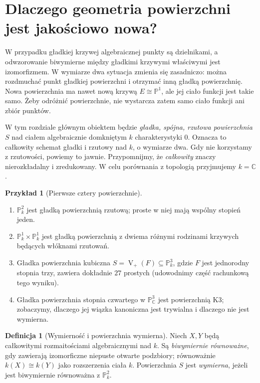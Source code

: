 \documentclass[11pt,a4paper,openany]{report}
\numberwithin{equation}{section}
\theoremstyle{plain}
\theoremstyle{definition}
\newtheorem{definicja}[twierdzenie]{Definicja}
\newtheorem{przyklad}[twierdzenie]{Przykład}
\theoremstyle{remark}
\newcommand{\C}{\mathbb C}
\newcommand{\PP}{\mathbb P}
\newcommand{\V}{\operatorname V}
\begin{document}
\providecommand{\atlasref}[2]{#2}


\section{Dlaczego geometria powierzchni jest jakościowo nowa?}
\label{sec:ga6-motywacja}

W przypadku gładkiej krzywej algebraicznej punkty są dzielnikami,
a odwzorowanie biwymierne między gładkimi krzywymi właściwymi jest
izomorfizmem. W wymiarze dwa sytuacja zmienia się zasadniczo:
można rozdmuchać punkt gładkiej powierzchni i otrzymać inną gładką
powierzchnię. Nowa powierzchnia ma nawet nową krzywą $E\cong\PP^1$,
ale jej ciało funkcji jest takie samo. Żeby odróżnić powierzchnie,
nie wystarcza zatem samo ciało funkcji ani zbiór punktów.

W tym rozdziale głównym obiektem będzie \emph{gładka, spójna,
rzutowa powierzchnia} $S$ nad ciałem algebraicznie domkniętym
$k$ charakterystyki $0$. Oznacza to całkowity schemat gładki i
rzutowy nad $k$, o wymiarze dwa. Gdy nie korzystamy z rzutowości,
powiemy to jawnie. Przypomnijmy, że \emph{całkowity} znaczy
nierozkładalny i zredukowany. W celu porównania z topologią
przyjmujemy $k=\C$.

\begin{przyklad}[Pierwsze cztery powierzchnie]
\label{prz:ga6-examples}
\begin{enumerate}[label=(\roman*)]
\item $\PP^2_k$ jest gładką powierzchnią rzutową; proste w niej
      mają wspólny stopień jeden.
\item $\PP^1_k\times\PP^1_k$ jest gładką powierzchnią z dwiema
      różnymi rodzinami krzywych będących włóknami rzutowań.
\item Gładka powierzchnia kubiczna $S=\V_+(F)\subseteq\PP^3_k$,
      gdzie $F$ jest jednorodny stopnia trzy, zawiera dokładnie
      $27$ prostych (udowodnimy część rachunkową tego wyniku).
\item Gładka powierzchnia stopnia czwartego w $\PP^3_\C$
      jest powierzchnią K3; zobaczymy, dlaczego jej wiązka
      kanoniczna jest trywialna i dlaczego nie jest wymierna.
\end{enumerate}
\end{przyklad}

\begin{definicja}[Wymierność i powierzchnia wymierna]
Niech $X,Y$ będą całkowitymi rozmaitościami algebraicznymi nad $k$.
Są \emph{biwymiernie równoważne}, gdy zawierają izomorficzne
niepuste otwarte podzbiory; równoważnie $k(X)\cong k(Y)$ jako
rozszerzenia ciała $k$. Powierzchnia $S$ jest \emph{wymierna},
jeżeli jest biwymiernie równoważna z $\PP^2_k$.
\end{definicja}
\end{document}
